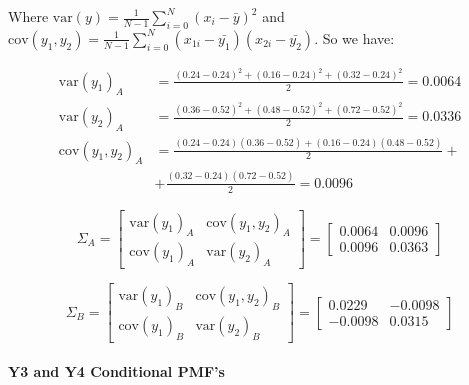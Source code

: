 \documentclass[12pt]{article}
\begin{document}
\begin{enumerate}[leftmargin=\labelsep]
\begin{enumerate}
        Where $\textrm{var}(y) = \frac{1}{N-1}\sum_{i = 0}^{N}(x_i - \bar{y})^2$ and $\textrm{cov}(y_1, y_2) = \frac{1}{N-1}\sum_{i = 0}^{N}(x_{1i} - \bar{y_1})(x_{2i} - \bar{y_2})$.
        So we have:

        \begin{equation}
        \begin{split}
            \textrm{var}(y_1)_A &= \frac{(0.24-0.24)^2 + (0.16-0.24)^2 + (0.32-0.24)^2}{2} = 0.0064 \\
            \textrm{var}(y_2)_A &= \frac{(0.36-0.52)^2 + (0.48-0.52)^2 + (0.72-0.52)^2}{2} = 0.0336 \\
            \textrm{cov}(y_1, y_2)_A &= \frac{(0.24-0.24)(0.36-0.52) + (0.16-0.24)(0.48-0.52)}{2}+ \\
            &+ \frac{(0.32-0.24)(0.72-0.52)}{2} = 0.0096
        \end{split}
        \end{equation}

        \begin{equation}
            \Sigma_A =
            \begin{bmatrix}
                \textrm{var}(y_1)_A & \textrm{cov}(y_1, y_2)_A \\
                \textrm{cov}(y_1)_A & \textrm{var}(y_2)_A
            \end{bmatrix}=
            \begin{bmatrix}
                0.0064 & 0.0096 \\
                0.0096 & 0.0363
            \end{bmatrix}
        \end{equation}

        \begin{equation}
            \Sigma_B =
            \begin{bmatrix}
                \textrm{var}(y_1)_B & \textrm{cov}(y_1, y_2)_B \\
                \textrm{cov}(y_1)_B & \textrm{var}(y_2)_B
            \end{bmatrix}=
            \begin{bmatrix}
                0.0229 & -0.0098 \\
                -0.0098 & 0.0315
            \end{bmatrix}
        \end{equation}

        \paragraph{Y3 and Y4 Conditional PMF's}


\end{enumerate}
\end{enumerate}
\end{document}
